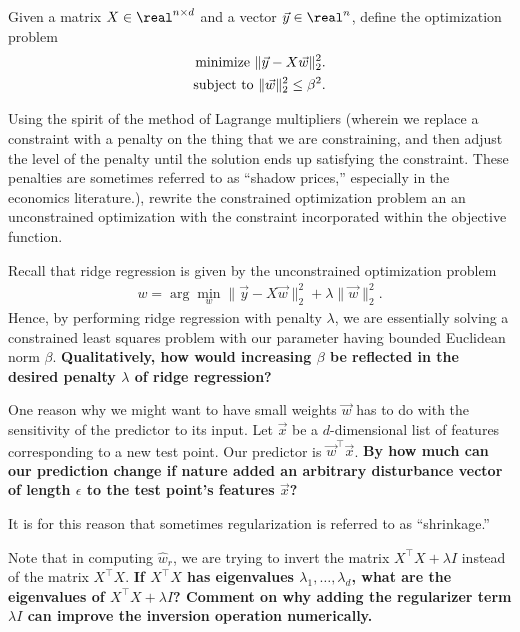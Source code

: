 \begin{Parts}

\Part Given a matrix $X \in \real^{n \times d}$ and a vector $\vec{y} \in \real^n$, define the optimization problem
\begin{align}
\text{minimize } \| \vec{y} - X \vec{w} \|_2^2. \label{eq:constrained} \\
\text{subject to } \|\vec{w} \|_2^2 \leq \beta^2. \notag
\end{align}

Using the spirit of the method of Lagrange multipliers (wherein we replace a constraint with a penalty on the thing that we are constraining, and then adjust the level of the penalty until the solution ends up satisfying the constraint. These penalties are sometimes referred to as ``shadow prices,'' especially in the economics literature.), rewrite the constrained optimization problem an an unconstrained optimization with the constraint incorporated within the objective function.

Recall that ridge regression is given by the unconstrained optimization problem
\begin{align}
w = \arg\min_{w} \| \vec{y} - X \vec{w} \|_2^2 + \lambda \|\vec{w}\|_2^2. \label{eq:ridge}
\end{align}
Hence, by performing ridge regression with penalty $\lambda$, we are essentially solving a constrained least squares problem with our parameter having bounded Euclidean norm $\beta$. {\bf Qualitatively, how would increasing $\beta$ be reflected in the desired penalty $\lambda$ of ridge regression?}

\Part One reason why we might want to have small weights $\vec{w}$ has to do with the sensitivity of the predictor to its input. Let $\vec{x}$ be a $d$-dimensional list of features corresponding to a new test point. Our predictor is $\vec{w}^\top \vec{x}$. {\bf By how much can our prediction change if nature added an arbitrary disturbance vector of length $\epsilon$ to the test point's features $\vec{x}$? }


 It is for this reason that sometimes regularization is referred to as ``shrinkage.''

\Part Note that in computing $\hat{w}_r$, we are trying to invert the matrix $X^\top X + \lambda I$ instead of the matrix $X^\top X$. {\bf If $X^\top X$ has eigenvalues $\lambda_1, \ldots, \lambda_d$, what are the eigenvalues of $X^\top X + \lambda I$? Comment on why adding the regularizer term $\lambda I$ can improve the inversion operation numerically.}


\end{Parts}
